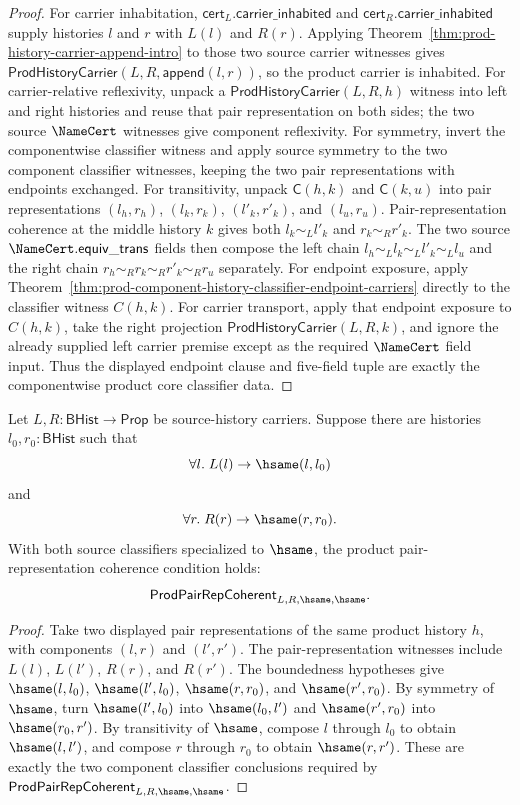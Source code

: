\begin{proof}
For carrier inhabitation, $\mathsf{cert}_L.\mathsf{carrier\_inhabited}$ and
$\mathsf{cert}_R.\mathsf{carrier\_inhabited}$ supply histories $l$ and $r$
with $L(l)$ and $R(r)$. Applying
Theorem~\ref{thm:prod-history-carrier-append-intro} to those two source
carrier witnesses gives
$\mathsf{ProdHistoryCarrier}(L,R,\mathsf{append}(l,r))$, so the product
carrier is inhabited. For carrier-relative reflexivity, unpack a
$\mathsf{ProdHistoryCarrier}(L,R,h)$ witness into left and right histories and
reuse that pair representation on both sides; the two source $\NameCert$
witnesses give component reflexivity. For symmetry, invert the
componentwise classifier witness and apply source symmetry to the two component
classifier witnesses, keeping the two pair representations with endpoints
exchanged. For transitivity, unpack $\mathsf{C}(h,k)$ and
$\mathsf{C}(k,u)$ into pair representations $(l_h,r_h)$, $(l_k,r_k)$,
$(l'_k,r'_k)$, and $(l_u,r_u)$. Pair-representation coherence at the middle
history $k$ gives both $l_k\sim_L l'_k$ and $r_k\sim_R r'_k$. The two source
$\NameCert.\mathsf{equiv\_trans}$ fields then compose the left chain
$l_h\sim_L l_k\sim_L l'_k\sim_L l_u$ and the right chain
$r_h\sim_R r_k\sim_R r'_k\sim_R r_u$ separately. For endpoint exposure, apply
Theorem~\ref{thm:prod-component-history-classifier-endpoint-carriers} directly
to the classifier witness $C(h,k)$. For carrier transport, apply that endpoint
exposure to $C(h,k)$, take the right projection
$\mathsf{ProdHistoryCarrier}(L,R,k)$, and ignore the already supplied left
carrier premise except as the required $\NameCert$ field input. Thus the
displayed endpoint clause and five-field tuple are exactly the componentwise
product core classifier data.
\end{proof}

\begin{theorem}
\label{thm:prod-pair-rep-bounded-hsame-coherence}
Let $L,R:\mathsf{BHist}\to\mathsf{Prop}$ be source-history carriers. Suppose
there are histories $l_0,r_0:\mathsf{BHist}$ such that
$$
\forall l.\;L(l)\to\hsame(l,l_0)
$$
and
$$
\forall r.\;R(r)\to\hsame(r,r_0).
$$
With both source classifiers specialized to $\hsame$, the product
pair-representation coherence condition holds:
$$
\mathsf{ProdPairRepCoherent}_{L,R,\hsame,\hsame}.
$$
\end{theorem}
\begin{proof}
Take two displayed pair representations of the same product history $h$, with
components $(l,r)$ and $(l',r')$. The pair-representation witnesses include
$L(l)$, $L(l')$, $R(r)$, and $R(r')$. The boundedness hypotheses give
$\hsame(l,l_0)$, $\hsame(l',l_0)$, $\hsame(r,r_0)$, and $\hsame(r',r_0)$.
By symmetry of $\hsame$, turn $\hsame(l',l_0)$ into $\hsame(l_0,l')$ and
$\hsame(r',r_0)$ into $\hsame(r_0,r')$. By transitivity of $\hsame$, compose
$l$ through $l_0$ to obtain $\hsame(l,l')$, and compose $r$ through $r_0$ to
obtain $\hsame(r,r')$. These are exactly the two component classifier
conclusions required by $\mathsf{ProdPairRepCoherent}_{L,R,\hsame,\hsame}$.
\end{proof}

